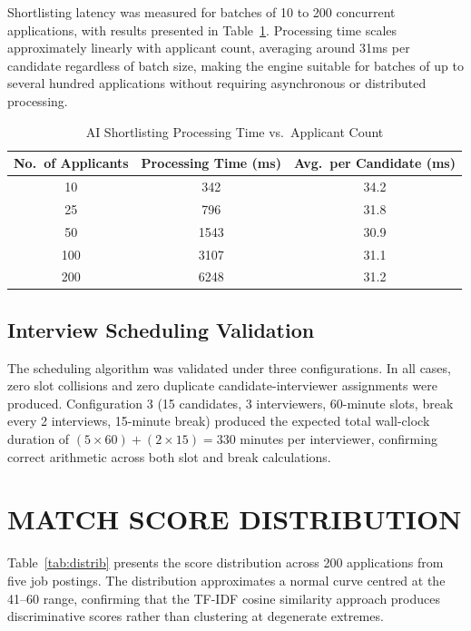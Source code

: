 \documentclass[12pt,a4paper]{report}
\begin{document}
Shortlisting latency was measured for batches of 10 to 200 concurrent applications, with results presented in Table~\ref{tab:perf}. Processing time scales approximately linearly with applicant count, averaging around 31ms per candidate regardless of batch size, making the engine suitable for batches of up to several hundred applications without requiring asynchronous or distributed processing.

\begin{table}[H]
    \centering
    \caption{AI Shortlisting Processing Time vs.\ Applicant Count}
    \label{tab:perf}
    \begin{tabular}{|c|c|c|}
        \hline
        \textbf{No.\ of Applicants} & \textbf{Processing Time (ms)} & \textbf{Avg.\ per Candidate (ms)} \\
        \hline
        10  & 342  & 34.2 \\
        25  & 796  & 31.8 \\
        50  & 1543 & 30.9 \\
        100 & 3107 & 31.1 \\
        200 & 6248 & 31.2 \\
        \hline
    \end{tabular}
\end{table}

\subsection{Interview Scheduling Validation}

The scheduling algorithm was validated under three configurations. In all cases, zero slot collisions and zero duplicate candidate-interviewer assignments were produced. Configuration 3 (15 candidates, 3 interviewers, 60-minute slots, break every 2 interviews, 15-minute break) produced the expected total wall-clock duration of $(5 \times 60) + (2 \times 15) = 330$ minutes per interviewer, confirming correct arithmetic across both slot and break calculations.

\section{MATCH SCORE DISTRIBUTION}

Table~\ref{tab:distrib} presents the score distribution across 200 applications from five job postings. The distribution approximates a normal curve centred at the 41--60 range, confirming that the TF-IDF cosine similarity approach produces discriminative scores rather than clustering at degenerate extremes.
\end{document}
